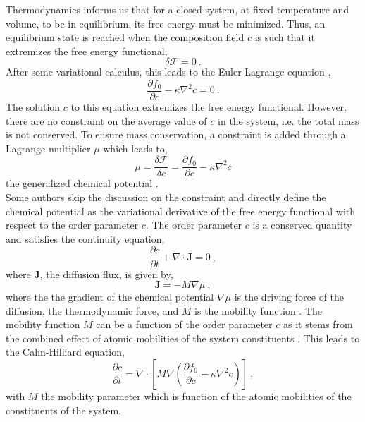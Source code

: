     Thermodynamics informs us that for a closed system, at fixed temperature and volume, to be in equilibrium, its free energy must be minimized. Thus, an equilibrium state is reached when the composition field $c$ is such that it extremizes the free energy functional, 
    \begin{equation}
        \delta \mathcal{F} = 0\ .
    \end{equation}
    After some variational calculus, this leads to the Euler-Lagrange equation \cite{Voorhees2018},
    \begin{equation}
        \frac{\partial f_0}{\partial c} - \kappa \nabla^2 c = 0\ .
        \label{eq:1-euler-lagrange}
    \end{equation}
    The solution $c$ to this equation extremizes the free energy functional. However, there are no constraint on the average value of $c$ in the system, i.e. the total mass is not conserved. To ensure mass conservation, a constraint is added through a Lagrange multiplier $\mu$ which leads to,
    \begin{equation}
        \mu = \frac{\delta \mathcal{F}}{\delta c} = \frac{\partial f_0}{\partial c} - \kappa \nabla^2 c
    \end{equation}
    the generalized chemical potential \cite{Voorhees2018}.\\
    Some authors skip the discussion on the constraint and directly define the chemical potential as the variational derivative of the free energy functional with respect to the order parameter $c$. 
    The order parameter $c$ is a conserved quantity and satisfies the continuity equation,
    \begin{equation}
        \frac{\partial c}{\partial t} + \nabla \cdot \mathbf{J} = 0\ ,
    \end{equation}
    where $\mathbf{J}$, the diffusion flux, is given by,
    \begin{equation}
        \mathbf{J} = -M \nabla \mu \ ,
        \label{eq:1-flux}
    \end{equation}
    where the the gradient of the chemical potential $\nabla \mu$ is the driving force of the diffusion, the thermodynamic force, and $M$ is the mobility function \cite{Voorhees2018,MoelansBlanpainWollants2008}. The mobility function $M$ can be a function of the order parameter $c$ as it stems from the combined effect of atomic mobilities of the system constituents \cite{Voorhees2018,MoelansBlanpainWollants2008}.
    This leads to the Cahn-Hilliard equation,
    \begin{equation}
        \frac{\partial c}{\partial t} = \nabla \cdot \left[ M \nabla \left( \frac{\partial f_0}{\partial c} - \kappa \nabla^2 c \right) \right]\ ,
    \end{equation}
    with $M$ the mobility parameter which is function of the atomic mobilities of the constituents of the system.
